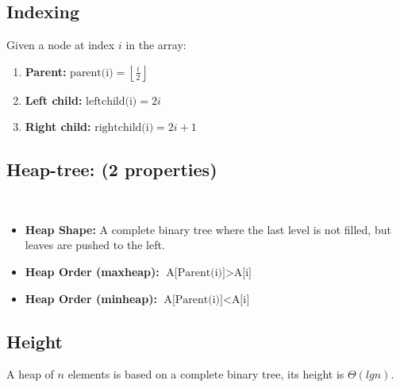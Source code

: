 \documentclass{article}
\begin{document}
\subsection{Indexing}
\begin{definition}
    Given a node at index $i$ in the array:

    \begin{enumerate}
        \item \textbf{Parent:} $\text{parent(i)} = \left \lfloor \frac{i}{2} \right \rfloor$
        \item \textbf{Left child:} $\text{leftchild(i)} = 2i$
        \item \textbf{Right child:} $\text{rightchild(i)} = 2i+1$
    \end{enumerate}
\end{definition}

\subsection{Heap-tree: (2 properties)}\
    \begin{definition}
        \begin{itemize}
            \item \textbf{Heap Shape:} A complete binary tree where the last level is not filled, but leaves are pushed to the left.
            \item \textbf{Heap Order (maxheap):} $\text{A[Parent(i)]} > \text{A[i]}$
            \item \textbf{Heap Order (minheap):} $\text{A[Parent(i)]} < \text{A[i]}$
        \end{itemize}
    \end{definition}

\subsection{Height}
\begin{definition}
    A heap of $n$ elements is based on a complete binary tree, its height is $\Theta(lg n)$.
\end{definition}
\end{document}
